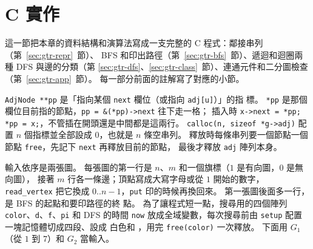 \section{C 實作}
\label{sec:gtr-c}

這一節把本章的資料結構和演算法寫成一支完整的 C 程式：鄰接串列（第~\ref{sec:gtr-repr}~節）、
BFS 和印出路徑（第~\ref{sec:gtr-bfs}~節）、遞迴和迴圈兩種 DFS 與邊的分類（第
\ref{sec:gtr-dfs}、\ref{sec:gtr-class}~節）、連通元件和二分圖檢查（第~\ref{sec:gtr-app}~節）。
每一部分前面的註解寫了對應的小節。

\begin{cbookrecap}[第~14~章 14.5 節、第~19~章 19.3、19.9--19.11 節]
\texttt{AdjNode **pp} 是「指向某個 \texttt{next} 欄位（或指向 \texttt{adj[u]}）」的指
標。 \texttt{*pp} 是那個欄位目前指的節點，\texttt{pp = \&(*pp)->next} 往下走一格；
插入時 \texttt{x->next = *pp; *pp = x;}，不管插在開頭還是中間都是這兩行。
\texttt{calloc(n, sizeof *g->adj)} 配置 $n$ 個指標並全部設成 $0$，也就是 $n$ 條空串列。
釋放時每條串列要一個節點一個節點 \texttt{free}，先記下 \texttt{next} 再釋放目前的節點，
最後才釋放 \texttt{adj} 陣列本身。
\end{cbookrecap}

輸入依序是兩張圖。 每張圖的第一行是 $n$、$m$ 和一個旗標（$1$ 是有向圖，$0$ 是無向圖），
接著 $m$ 行各一條邊；頂點寫成大寫字母或從 $1$ 開始的數字，\texttt{read\_vertex} 把它換成
$0..n-1$，\texttt{put} 印的時候再換回來。 第一張圖後面多一行，是 BFS 的起點和要印路徑的終
點。 為了讓程式短一點，搜尋用的四個陣列 \texttt{color}、\texttt{d}、\texttt{f}、\texttt{pi}
和 DFS 的時間 \texttt{now} 放成全域變數，每次搜尋前由 \texttt{setup} 配置一塊記憶體切成四段、設成
白色和 \NIL，用完 \texttt{free(color)} 一次釋放。 下面用 $G_1$（從 $1$ 到 $7$）和 $G_2$ 當輸入。

